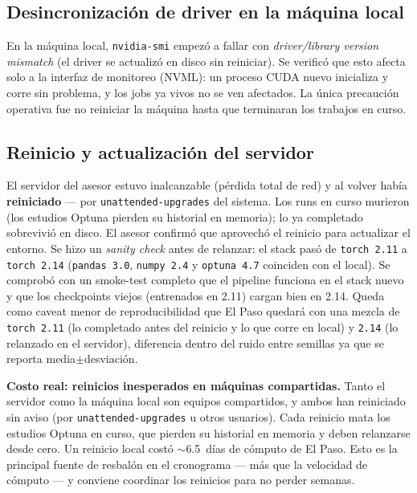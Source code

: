\documentclass[12pt,a4paper]{article}
\begin{document}
\subsection{Desincronización de driver en la máquina local}

En la máquina local, \texttt{nvidia-smi} empezó a fallar con
\emph{driver/library version mismatch} (el driver se actualizó en disco sin
reiniciar). Se verificó que esto afecta solo a la interfaz de monitoreo
(NVML): un proceso CUDA nuevo inicializa y corre sin problema, y los jobs ya
vivos no se ven afectados. La única precaución operativa fue no reiniciar la
máquina hasta que terminaran los trabajos en curso.

\subsection{Reinicio y actualización del servidor}

El servidor del asesor estuvo inalcanzable (pérdida total de red) y al volver
había \textbf{reiniciado} --- por \texttt{unattended-upgrades} del sistema.
Los runs en curso murieron (los estudios Optuna pierden su historial en
memoria); lo ya completado sobrevivió en disco. El asesor confirmó que
aprovechó el reinicio para actualizar el entorno. Se hizo un \emph{sanity
check} antes de relanzar: el stack pasó de \texttt{torch~2.11} a
\texttt{torch~2.14} (\texttt{pandas~3.0}, \texttt{numpy~2.4} y
\texttt{optuna~4.7} coinciden con el local). Se comprobó con un smoke-test
completo que el pipeline funciona en el stack nuevo y que los checkpoints
viejos (entrenados en 2.11) cargan bien en 2.14. Queda como caveat menor de
reproducibilidad que El Paso quedará con una mezcla de \texttt{torch~2.11}
(lo completado antes del reinicio y lo que corre en local) y \texttt{2.14}
(lo relanzado en el servidor), diferencia dentro del ruido entre semillas ya
que se reporta media$\pm$desviación.

\textbf{Costo real: reinicios inesperados en máquinas compartidas.} Tanto el
servidor como la máquina local son equipos compartidos, y ambos han
reiniciado sin aviso (por \texttt{unattended-upgrades} u otros usuarios). Cada
reinicio mata los estudios Optuna en curso, que pierden su historial en
memoria y deben relanzarse desde cero. Un reinicio local costó
$\sim$6.5~días de cómputo de El Paso. Esto es la principal fuente de
resbalón en el cronograma --- más que la velocidad de cómputo --- y conviene
coordinar los reinicios para no perder semanas.

\end{document}
